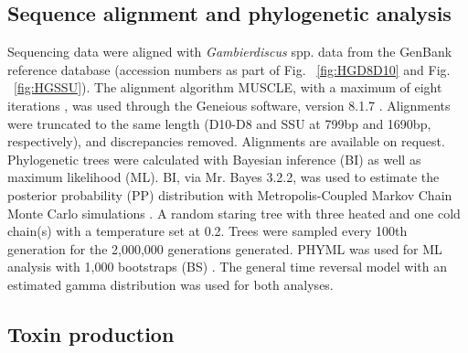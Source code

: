 \documentclass[12pt]{article}
\begin{document}
\subsection{Sequence alignment and phylogenetic analysis}
Sequencing data were aligned with \emph{Gambierdiscus} spp. data from the GenBank reference database (accession numbers as part of Fig. ~\ref{fig:HGD8D10} and Fig. ~\ref{fig:HGSSU}). 
The alignment algorithm MUSCLE, with a maximum of eight iterations \citep{edgar2004muscle}, was used through the Geneious software, version 8.1.7 \citep{kearse2012geneious}. 
Alignments were truncated to the same length (D10-D8 and SSU at 799bp and 1690bp, respectively), and discrepancies removed. 
Alignments are available on request.
Phylogenetic trees were calculated with Bayesian inference (BI) as well as maximum likelihood (ML). 
BI, via Mr. Bayes 3.2.2, was used to estimate the posterior probability (PP) distribution with Metropolis-Coupled Markov Chain Monte Carlo simulations \citep{ronquist2003mrbayes}. 
A random staring tree with three heated and one cold chain(s) with a temperature set at 0.2. Trees were sampled every 100th generation for the 2,000,000 generations generated.
PHYML was used for ML analysis with 1,000 bootstraps (BS) \citep{guindon2003simple}.
The general time reversal model with an estimated gamma distribution was used for both analyses.\\

\subsection{Toxin production}
\end{document}
